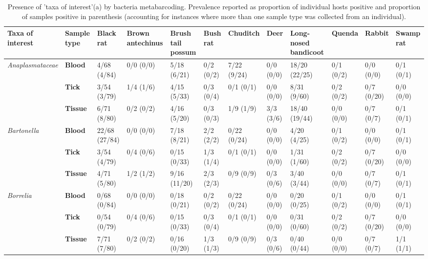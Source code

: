 \documentclass[a4paper, nobind]{templates/ociamthesis}
\begin{document}
\begin{landscape}\begin{table}

\caption[Bacteria 'taxa of interest' prevalence in wildlife and ticks.]{\label{tab:T3prev}Presence of 'taxa of interest'(a) by bacteria metabarcoding. Prevalence reported as proportion of individual hosts positive and proportion of samples positive in parenthesis (accounting for instances where more than one sample type was collected from an individual).}
\centering
\fontsize{8.5}{10.5}\selectfont
\begin{tabular}[t]{>{}l>{}lllllllllll}
\toprule
Taxa of interest & Sample type & Black rat & Brown antechinus & Brush tail possum & Bush rat & Chuditch & Deer & Long-nosed bandicoot & Quenda & Rabbit & Swamp rat\\
\midrule
\em{Anaplasmataceae} & \textbf{Blood} & 4/68 (4/84) & 0/0 (0/0) & 5/18 (6/21) & 0/2 (0/2) & 7/22 (9/24) & 0/0 (0/0) & 18/20 (22/25) & 0/1 (0/2) & 0/0 (0/0) & 0/1 (0/1)\\
\em{} & \textbf{Tick} & 3/54 (3/79) & 1/4 (1/6) & 4/15 (5/33) & 0/3 (0/4) & 0/1 (0/1) & 0/0 (0/0) & 8/31 (9/60) & 0/2 (0/2) & 0/7 (0/20) & 0/0 (0/0)\\
\em{} & \textbf{Tissue} & 6/71 (8/80) & 0/2 (0/2) & 4/16 (5/20) & 0/3 (0/3) & 1/9 (1/9) & 3/3 (3/6) & 18/40 (19/44) & 0/0 (0/0) & 0/7 (0/7) & 0/1 (0/1)\\
\em{Bartonella} & \textbf{Blood} & 22/68 (27/84) & 0/0 (0/0) & 7/18 (8/21) & 2/2 (2/2) & 0/22 (0/24) & 0/0 (0/0) & 4/20 (4/25) & 0/1 (0/2) & 0/0 (0/0) & 0/1 (0/1)\\
\em{} & \textbf{Tick} & 3/54 (4/79) & 0/4 (0/6) & 0/15 (0/33) & 1/3 (1/4) & 0/1 (0/1) & 0/0 (0/0) & 1/31 (1/60) & 0/2 (0/2) & 0/7 (0/20) & 0/0 (0/0)\\
\em{} & \textbf{Tissue} & 4/71 (5/80) & 1/2 (1/2) & 9/16 (11/20) & 2/3 (2/3) & 0/9 (0/9) & 0/3 (0/6) & 3/40 (3/44) & 0/0 (0/0) & 0/7 (0/7) & 0/1 (0/1)\\
\em{Borrelia} & \textbf{Blood} & 0/68 (0/84) & 0/0 (0/0) & 0/18 (0/21) & 0/2 (0/2) & 0/22 (0/24) & 0/0 (0/0) & 0/20 (0/25) & 0/1 (0/2) & 0/0 (0/0) & 0/1 (0/1)\\
\em{} & \textbf{Tick} & 0/54 (0/79) & 0/4 (0/6) & 0/15 (0/33) & 0/3 (0/4) & 0/1 (0/1) & 0/0 (0/0) & 0/31 (0/60) & 0/2 (0/2) & 0/7 (0/20) & 0/0 \vphantom{1} (0/0)\\
\em{} & \textbf{Tissue} & 7/71 (7/80) & 0/2 (0/2) & 0/16 (0/20) & 1/3 (1/3) & 0/9 (0/9) & 0/3 (0/6) & 0/40 (0/44) & 0/0 (0/0) & 0/7 (0/7) & 1/1 (1/1)\\

\end{tabular}
\end{table}
\end{landscape}
\end{document}

